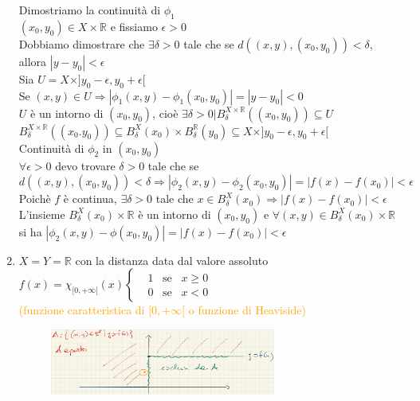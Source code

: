 \documentclass{article}
\newcommand{\R}{\mathbb{R}}
\begin{document}
\begin{enumerate}
    Dimostriamo la continuità di $\phi_1$\\
    $(x_0,y_0) \in X \times \R$ e fissiamo $\epsilon >0$\\
    Dobbiamo dimostrare che $\exists \delta >0 $ tale che se $d((x,y),(x_0,y_0))<\delta$, allora $|y-y_0|<\epsilon$\\
    Sia $U = X \times  ]y_0-\epsilon,y_0+\epsilon[$\\
    Se $(x,y)\in U \Rightarrow |\phi_1(x,y)-\phi_1(x_0,y_0)|=|y-y_0|<0$\\
    $U$ è un intorno di $(x_0,y_0)$, cioè $\exists \delta >0 | B_{\delta}^{X \times \R}((x_0,y_0))\subseteq U$\\
    $B_{\delta}^{X\times \R}((x_0.y_0))\subseteq B_{\delta}^{X}(x_0) \times B_{\delta}^{\R}(y_0)\subseteq X\times ]y_0-\epsilon,y_0+\epsilon[$\\
    Continuità di $\phi_2$ in $(x_0,y_0)$\\
    $\forall \epsilon >0$ devo trovare $\delta >0$ tale che se $d((x,y),(x_0,y_0))< \delta \Rightarrow |\phi_2(x,y)-\phi_2(x_0,y_0)|=|f(x)-f(x_0)|<\epsilon$\\
    Poichè $f$ è continua, $\exists \delta >0$ tale che $ x \in B_{\delta}^{X} (x_0) \Rightarrow |f(x)-f(x_0)|<\epsilon$\\
    L'insieme $B_{\delta}^{X}(x_0) \times \R$ è un intorno di $(x_0,y_0)$ e $\forall (x,y) \in B_{\delta}^{X}(x_0) \times \R$ si ha $|\phi_2(x,y)-\phi(x_0,y_0)|=|f(x)-f(x_0)|<\epsilon$
    \item $X=Y=\R$ con la distanza data dal valore assoluto\\
    $f(x)=\chi_{[0,+\infty[}(x) \begin{cases}
         &1 \,\,\,\,\,\text{se}\,\,\,\,\, x \geq 0\\
        &0\,\,\,\,\, \text{se}\,\,\,\,\, x < 0
    \end{cases}$ \\
    \textcolor{orange}{(funzione caratteristica di $[0,+\infty[$ o funzione di Heaviside)}\\
    \begin{figure}[!h]
        \centering
        \includegraphics[width=0.7\textwidth]{Screenshot from 2023-03-28 22-16-16.png}
    \end{figure}
    

\end{enumerate}
\end{document}
